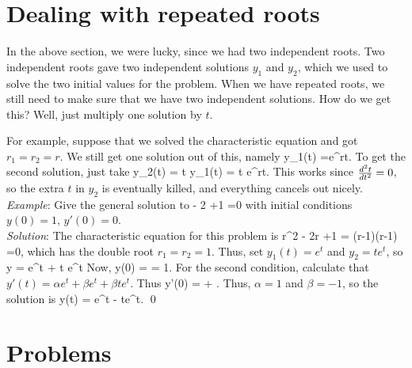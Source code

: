 \documentclass[12pt]{book}
\begin{document}
\section{Dealing with repeated roots}
In the above section, we were lucky, since we had two independent roots.
Two independent roots gave two independent solutions $y_1$ and $y_2$, which
we used to solve the two initial values for the problem. When we have 
repeated roots, we still need to make sure that we have two independent 
solutions. How do we get this? Well, just multiply one solution by $t$.

For example, suppose that we solved the characteristic equation and got 
$r_1=r_2=r$. We still get one solution out of this, namely
\bee
y_1(t) =e^{rt}.
\eee
To get the second solution, just take
\bee
y_2(t) = t y_1(t) = t e^{rt}.
\eee
This works since $\frac{d^2 t}{d t^2}=0$, so the extra $t$ in $y_2$ is eventually
killed, and everything cancels out nicely.
\\

\noindent\emph{Example}: Give the general solution to
\bee
{} - 2 +1 =0
\eee
with initial conditions $y(0) =1, \, y'(0) =0.$\\
\noindent\emph{Solution}:
The characteristic equation for this problem is
\bee
r^2 - 2r +1 = (r-1)(r-1) =0,
\eee
which has the double root $r_1=r_2=1$. Thus, set 
$y_1(t) = e^t$ and $y_2=t e^t$, so
\bee
y = \alpha e^t + \beta t e^t
\eee
Now,
\bee
y(0) = \alpha = 1.
\eee
For the second condition, calculate that 
$y'(t) = \alpha e^t + \beta e^t + \beta te^t$. Thus
\bee
y'(0) = \alpha + .
\eee
Thus, $\alpha=1$ and $\beta =-1$, so the solution is
\bee
y(t) = e^t - te^t. \qed
\eee


\section{Problems}
\end{document}

